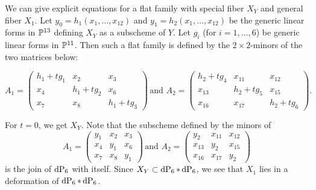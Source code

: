 \begin{remark}
\label{remark_X1}
We can give explicit equations for a flat family with special fiber $X_Y$ and general fiber $X_1$. Let $y_0=h_1(x_1,\ldots,x_{12})$ and $y_1=h_2(x_1,\ldots,x_{12})$ be the generic linear forms in $\P^{13}$ defining $X_Y$ as a subscheme of $Y$. Let $g_i$ (for $i=1,\ldots,6$) be generic linear forms in $\P^{11}$. Then such a flat family is defined by the $2 \times 2$-minors of the two matrices below:

\[
A_1 = \begin{pmatrix}
h_1 + tg_1  & x_2 & x_3 \\
x_4 & h_1+tg_2  & x_6 \\
x_7 & x_8 & h_1+tg_3 
\end{pmatrix}\,
\text{and }
A_2 = \begin{pmatrix}
h_2+tg_4 & x_{11} & x_{12} \\
x_{13} & h_2+tg_5 & x_{15} \\
x_{16} & x_{17} & h_2+tg_6
\end{pmatrix}.
\]

For $t=0$, we get $X_Y$. Note that the subscheme defined by the minors of 
\[
A_1 = \begin{pmatrix}
y_1  & x_2 & x_3 \\
x_4 & y_1  & x_6 \\
x_7 & x_8 & y_1
\end{pmatrix}\,
\text{and }
A_2 = \begin{pmatrix}
y_2 & x_{11} & x_{12} \\
x_{13} & y_2 & x_{15} \\
x_{16} & x_{17} & y_2
\end{pmatrix}
\]
is the join of $\dP6$ with itself. Since $X_Y \subset \dP6 \ast \dP6$, we see that $X_1$ lies in a deformation of $\dP6 \ast \dP6$.
\end{remark}

